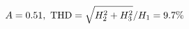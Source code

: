 \documentclass[preview]{standalone}
\begin{document}
\begin{align*}
\special{dvisvgm:raw <g id='unique000'>}A=0.51,\ \text{THD}=\sqrt{H_2^2+H_3^2}/H_1=9.7\%\special{dvisvgm:raw </g>}
\end{align*}
\end{document}
